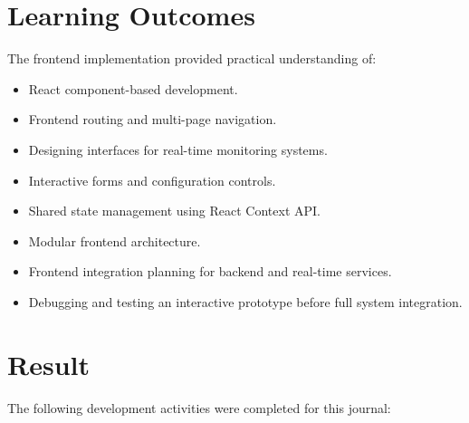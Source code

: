 \documentclass[12pt,a4paper]{article}
\begin{document}

\section{Learning Outcomes}

The frontend implementation provided practical understanding of:

\begin{itemize}

    \item React component-based development.

    \item Frontend routing and multi-page navigation.

    \item Designing interfaces for real-time monitoring systems.

    \item Interactive forms and configuration controls.

    \item Shared state management using React Context API.

    \item Modular frontend architecture.

    \item Frontend integration planning for backend and real-time services.

    \item Debugging and testing an interactive prototype before full system integration.

\end{itemize}


\section{Result}

The following development activities were completed for this journal:

\vspace{2pt}
\end{document}
